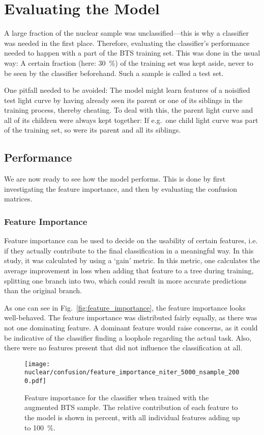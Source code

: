 \section{Evaluating the Model}
A large fraction of the nuclear sample was unclassified---this is why a classifier was needed in the first place. Therefore, evaluating the classifier's performance needed to happen with a part of the BTS training set. This was done in the usual way: A certain fraction (here: \SI{30}{\percent}) of the training set was kept aside, never to be seen by the classifier beforehand. Such a sample is called a test set.

One pitfall needed to be avoided: The model might learn features of a noisified test light curve by having already seen its parent or one of its siblings in the training process, thereby cheating. To deal with this, the parent light curve and all of its children were always kept together: If e.g.~one child light curve was part of the training set, so were its parent and all its siblings.

\subsection{Performance}
We are now ready to see how the model performs. This is done by first investigating the feature importance, and then by evaluating the confusion matrices.

\subsubsection{Feature Importance}
Feature importance can be used to decide on the usability of certain features, i.e. if they actually contribute to the final classification in a meaningful way. In this study, it was calculated by using a `gain' metric. In this metric, one calculates the average improvement in loss when adding that feature to a tree during training, splitting one branch into two, which could result in more accurate predictions than the original branch.

As one can see in Fig.~\ref{fig:feature_importance}, the feature importance looks well-behaved. The feature importance was distributed fairly equally, as there was not one dominating feature. A dominant feature would raise concerns, as it could be indicative of the classifier finding a loophole regarding the actual task. Also, there were no features present that did not influence the classification at all.

\begin{figure}[htpb]
  \texttt{[image: nuclear/confusion/feature\_importance\_niter\_5000\_nsample\_2000.pdf]}
  \caption[Feature importance]{Feature importance for the classifier when trained with the augmented BTS sample. The relative contribution of each feature to the model is shown in percent, with all individual features adding up to \SI{100}{\percent}.}
\end{figure}

